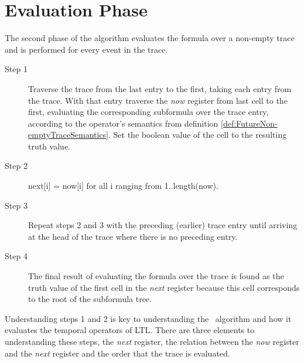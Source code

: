 \section{Evaluation Phase}
\label{sec:EvaluationPhase}
The second phase of the algorithm evaluates the formula over a non-empty trace and is performed for every event in the trace.\\
\begin{description}

\item[Step 1] Traverse the trace from the last entry to the first, taking each entry from the trace.  With that entry traverse the \textit{now} register from last cell to the first, evaluating the corresponding subformula over the trace entry, according to the operator's semantics from definition \ref{def:FutureNon-emptyTraceSemantics}.  Set the boolean value of the cell to the resulting truth value.

\item[Step 2] next[i] = now[i] for all i ranging from 1..length(now).

\item[Step 3] Repeat steps 2 and 3 with the preceding (earlier) trace entry until arriving at the head of the trace where there is no preceding entry.

\item[Step 4] The final result of evaluating the formula over the trace is found as the truth value of the first cell in the \textit{next} register because this cell corresponds to the root of the subformula tree.\\
\end{description}

Understanding steps 1 and 2 is key to understanding the \RH\ algorithm and how it evaluates the temporal operators of LTL.  There are three elements to understanding these steps, the \textit{next} register, the relation between the \textit{now} register and the \textit{next} register and the order that the trace is evaluated.


